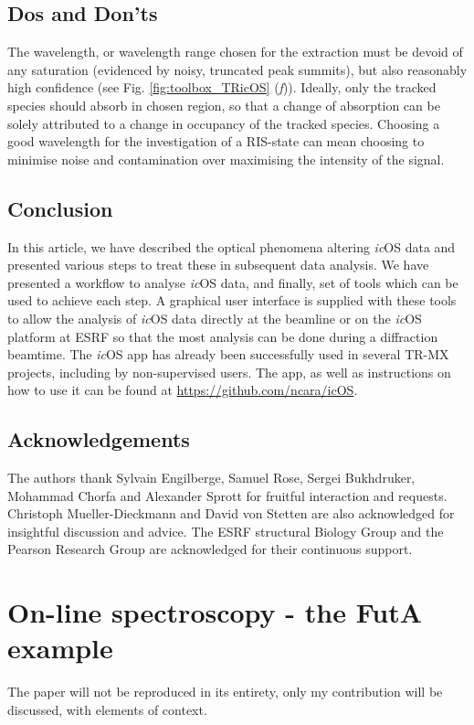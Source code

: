 \section{Dos and Don'ts}

The wavelength, or wavelength range chosen for the extraction must be devoid of any saturation (evidenced by noisy, truncated peak summits), but also reasonably high confidence (see Fig. \ref{fig:toolbox_TRicOS} (\textit{f})). 
Ideally, only the tracked species should absorb in chosen region, so that a change of absorption can be solely attributed to a change in occupancy of the tracked species. Choosing a good wavelength for the investigation of a RIS-state can mean choosing to minimise noise and contamination over maximising the intensity of the signal.


\section{Conclusion}
In this article, we have described the optical phenomena altering \textit{ic}OS data and presented various steps to treat these in subsequent data analysis. We have presented a workflow to analyse \textit{ic}OS data, and finally, set of tools which can be used to achieve each step. A graphical user interface is supplied with these tools to allow the analysis of \textit{ic}OS data directly at the beamline or on the \textit{ic}OS platform at ESRF so that the most analysis can be done during a diffraction beamtime. The \textit{ic}OS app has already been successfully used in several TR-MX projects, including by non-supervised users. The app, as well as instructions on how to use it can be found at \url{https://github.com/ncara/icOS}.

\section*{Acknowledgements}
The authors thank Sylvain Engilberge, Samuel Rose, Sergei Bukhdruker, Mohammad Chorfa and Alexander Sprott for fruitful interaction and requests. Christoph Mueller-Dieckmann and David von Stetten are also acknowledged for insightful discussion and advice. The ESRF structural Biology Group and the Pearson Research Group are acknowledged for their continuous support.


\chapter{On-line spectroscopy - the FutA example}\label{chap:online-microspec}
\noindent The paper will not be reproduced in its entirety, only my contribution will be discussed, with elements of context. 

